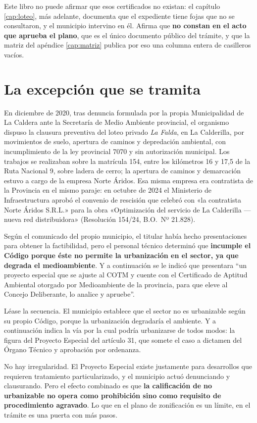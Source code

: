 Este libro no puede afirmar que esos certificados no existan: el capítulo \ref{cap:loteo}, más adelante, documenta que el
expediente tiene fojas que no se consultaron, y el municipio intervino en él. Afirma que
\textbf{no constan en el acto que aprueba el plano}, que es el único documento público del
trámite, y que la matriz del apéndice \ref{cap:matriz} publica por eso una columna entera de casilleros
vacíos.

\section{La excepción que se tramita}

En diciembre de 2020, tras denuncia formulada por la propia Municipalidad de La Caldera ante la Secretaría de Medio Ambiente provincial, el organismo dispuso la clausura preventiva del loteo privado \textit{La Falda}, en La Calderilla, por movimientos de suelo, apertura de caminos y depredación ambiental, con incumplimiento de la ley provincial 7070 y sin autorización municipal. Los trabajos se realizaban sobre la matrícula 154, entre los kilómetros 16 y 17,5 de la Ruta Nacional 9, sobre ladera de cerro; la apertura de caminos y demarcación estuvo a cargo de la empresa Norte Áridos. Esa misma empresa era contratista de la Provincia en el mismo paraje: en octubre de 2024 el Ministerio de Infraestructura aprobó el convenio de rescisión que celebró con «la contratista Norte Áridos S.R.L.» para la obra «Optimización del servicio de La Calderilla --- nueva red distribuidora» (Resolución 154/24, B.O.\ Nº 21.828).

Según el comunicado del propio municipio, el titular había hecho presentaciones para obtener la factibilidad, pero el personal técnico determinó que \textbf{incumple el Código porque éste no permite la urbanización en el sector, ya que degrada el medioambiente}. Y a continuación se le indicó que presentara ``un proyecto especial que se ajuste al COTM y cuente con el Certificado de Aptitud Ambiental otorgado por Medioambiente de la provincia, para que eleve al Concejo Deliberante, lo analice y apruebe''.

Léase la secuencia. El municipio establece que el sector no es urbanizable según su propio Código, porque la urbanización degradaría el ambiente. Y a continuación indica la vía por la cual podría urbanizarse de todos modos: la figura del Proyecto Especial del artículo 31, que somete el caso a dictamen del Órgano Técnico y aprobación por ordenanza.

No hay irregularidad. El Proyecto Especial existe justamente para desarrollos que requieren tratamiento particularizado, y el municipio actuó denunciando y clausurando. Pero el efecto combinado es que \textbf{la calificación de no urbanizable no opera como prohibición sino como requisito de procedimiento agravado}. Lo que en el plano de zonificación es un límite, en el trámite es una puerta con más pasos.

